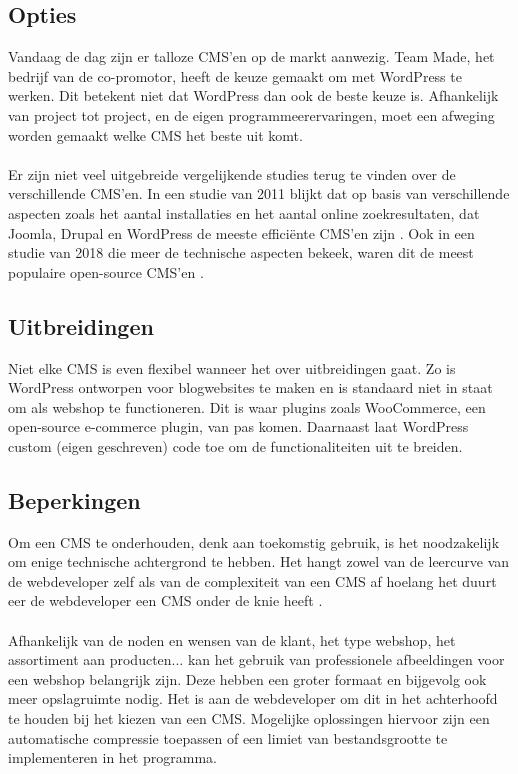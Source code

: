 \subsection{Opties}
Vandaag de dag zijn er talloze CMS'en op de markt aanwezig. Team Made, het bedrijf van de co-promotor, heeft de keuze gemaakt om met WordPress te werken. Dit betekent niet dat WordPress dan ook de beste keuze is. Afhankelijk van project tot project, en de eigen programmeerervaringen, moet een afweging worden gemaakt welke CMS het beste uit komt.
\\\\
Er zijn niet veel uitgebreide vergelijkende studies terug te vinden over de verschillende CMS'en. In een studie van 2011 blijkt dat op basis van verschillende aspecten zoals het aantal installaties en het aantal online zoekresultaten, dat Joomla, Drupal en WordPress de meeste efficiënte CMS'en zijn \autocite{Patel2011}. Ook in een studie van 2018 die meer de technische aspecten bekeek, waren dit de meest populaire open-source CMS'en \autocite{MartinezCaro2018}.
\subsection{Uitbreidingen}
Niet elke CMS is even flexibel wanneer het over uitbreidingen gaat. Zo is WordPress ontworpen voor blogwebsites te maken en is standaard niet in staat om als webshop te functioneren. Dit is waar plugins zoals WooCommerce, een open-source e-commerce plugin, van pas komen. Daarnaast laat WordPress custom (eigen geschreven) code toe om de functionaliteiten uit te breiden. 
\subsection{Beperkingen}
Om een CMS te onderhouden, denk aan toekomstig gebruik, is het noodzakelijk om enige technische achtergrond te hebben. Het hangt zowel van de leercurve van de webdeveloper zelf als van de complexiteit van een CMS af hoelang het duurt eer de webdeveloper een CMS onder de knie heeft \autocite{DriesBlanchaert2022}.
\\\\
Afhankelijk van de noden en wensen van de klant, het type webshop, het assortiment aan producten... kan het gebruik van professionele afbeeldingen voor een webshop belangrijk zijn. Deze hebben een groter formaat en bijgevolg ook meer opslagruimte nodig. Het is aan de webdeveloper om dit in het achterhoofd te houden bij het kiezen van een CMS. Mogelijke oplossingen hiervoor zijn een automatische compressie toepassen of een limiet van bestandsgrootte te implementeren in het programma. \autocite{LatumenRonaldDekker2004}

